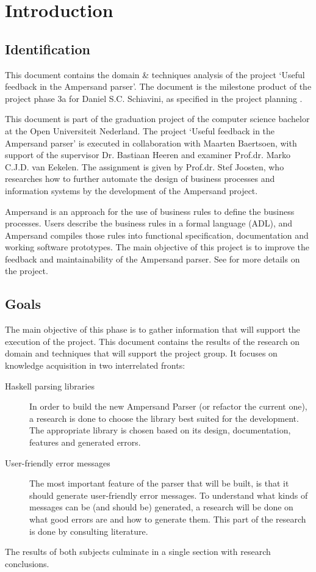 \section{Introduction}
\subsection{Identification}
This document contains the domain \& techniques analysis of the project `Useful feedback in the Ampersand parser'.
The document is the milestone product of the project phase 3a for Daniel S.C. Schiavini, as specified in the project planning  .

This document is part of the graduation project of the computer science bachelor at the Open Universiteit Nederland.
The project `Useful feedback in the Ampersand parser' is executed in collaboration with Maarten Baertsoen, with support of the supervisor Dr. Bastiaan Heeren and examiner Prof.dr. Marko C.J.D. van Eekelen.
The assignment is given by Prof.dr. Stef Joosten, who researches how to further automate the design of business processes and information systems by the development of the Ampersand project.

Ampersand is an approach for the use of business rules to define the business processes.
Users describe the business rules in a formal language (ADL), and Ampersand compiles those rules into functional specification, documentation and working software
prototypes.
The main objective of this project is to improve the feedback and maintainability of the Ampersand parser.
See  for more details on the project.

\subsection{Goals}
The main objective of this phase is to gather information that will support the execution of the project.
This document contains the results of the research on domain and techniques that will support the project group.
It focuses on knowledge acquisition in two interrelated fronts:
\begin{description}
	\item[Haskell parsing libraries]
	In order to build the new Ampersand Parser (or refactor the current one), a research is done to choose the library best suited for the development.
	The appropriate library is chosen based on its design, documentation, features and generated errors.
	
	\item[User-friendly error messages]
	The most important feature of the parser that will be built, is that it should generate user-friendly error messages.
	To understand what kinds of messages can be (and should be) generated, a research will be done on what good errors are and how to generate them.
	This part of the research is done by consulting literature.
\end{description}
%
The results of both subjects culminate in a single section with research conclusions.

